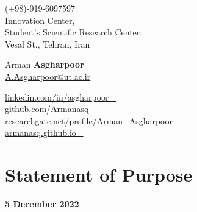 \documentclass[a4,25pt]{article}
\begin{document}
\begin{center}
    \begin{minipage}[b]{0.34\textwidth}
            \normalsize (+98)-919-6097597 \\
            \small Innovation Center, \\ Student’s Scientific Research Center, \\ Vesal St., Tehran, Iran\\
            
    \end{minipage}%
    \begin{minipage}[b]{0.34\textwidth} \hspace{-0.8cm}
            \centering
            {\huge Arman \Huge \textbf{Asgharpoor}} \\ %
            \vspace{0.1cm}
            \large \hspace{-0.8cm}\href{mailto:A.Asgharpoor@ut.ac.ir}{A.Asgharpoor@ut.ac.ir} \\
    \end{minipage}%
    \begin{minipage}[b]{0.31\textwidth}
            \flushright \large  %
            {\href{https://linkedin.com/in/asgharpoor/}{ \footnotesize linkedin.com/in/asgharpoor \faLinkedin\ }} \\
            {\href{https://github.com/Armanasq}{ \footnotesize github.com/Armanasq \faGithubSquare\ }}\\
            {\href{https://www.researchgate.net/profile/Arman_Asgharpoor}{ \footnotesize researchgate.net/profile/Arman\_Asgharpoor \aiResearchGateSquare\ }}\\
            {\href{http://armanasq.github.io/}{\footnotesize armanasq.github.io \faGlobe\ }}
    \end{minipage} 
     
\end{center}
\vspace{-0.3cm}\section{\vspace{-0.5cm}\Large{Statement of Purpose}}
 \small  \vspace{-0.79cm} \textbf{5 December 2022}  \par
\justifying
\end{document}
